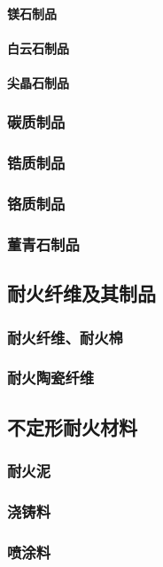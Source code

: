 \documentclass[UTF8]{../../ApplicationUniverse}
\begin{document}
            \paragraph{镁石制品}
            \paragraph{白云石制品}
            \paragraph{尖晶石制品}
        \subsubsection{碳质制品}
        \subsubsection{锆质制品}
        \subsubsection{铬质制品}
        \subsubsection{董青石制品}
    \subsection{耐火纤维及其制品}
        \subsubsection{耐火纤维、耐火棉}
        \subsubsection{耐火陶瓷纤维}
    \subsection{不定形耐火材料}
        \subsubsection{耐火泥}
        \subsubsection{浇铸料}
        \subsubsection{喷涂料}
\end{document}
